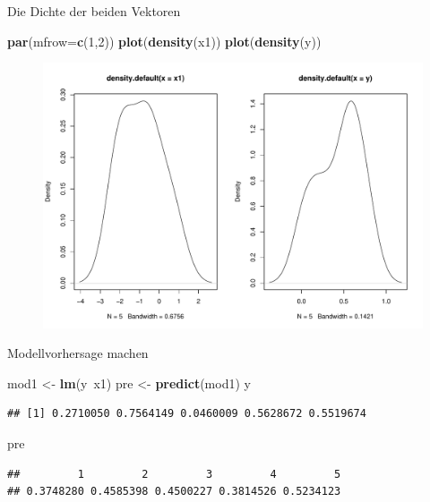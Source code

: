 \documentclass[ignorenonframetext,]{beamer}
\newenvironment{Shaded}{}{}
\newcommand{\KeywordTok}[1]{\textcolor[rgb]{0.00,0.44,0.13}{\textbf{{#1}}}}
\newcommand{\DataTypeTok}[1]{\textcolor[rgb]{0.56,0.13,0.00}{{#1}}}
\newcommand{\DecValTok}[1]{\textcolor[rgb]{0.25,0.63,0.44}{{#1}}}
\newcommand{\StringTok}[1]{\textcolor[rgb]{0.25,0.44,0.63}{{#1}}}
\newcommand{\NormalTok}[1]{{#1}}
\begin{document}
\begin{frame}[fragile]{Die Dichte der beiden Vektoren}

\begin{Shaded}
\begin{Highlighting}[]
\KeywordTok{par}\NormalTok{(}\DataTypeTok{mfrow=}\KeywordTok{c}\NormalTok{(}\DecValTok{1}\NormalTok{,}\DecValTok{2}\NormalTok{))}
\KeywordTok{plot}\NormalTok{(}\KeywordTok{density}\NormalTok{(x1))}
\KeywordTok{plot}\NormalTok{(}\KeywordTok{density}\NormalTok{(y))}
\end{Highlighting}
\end{Shaded}

\begin{figure}[htbp]
\centering
\includegraphics{RSocialScience2_files/figure-beamer/unnamed-chunk-73-1.pdf}
\caption{}
\end{figure}

\end{frame}

\begin{frame}[fragile]{Modellvorhersage machen}

\begin{Shaded}
\begin{Highlighting}[]
\NormalTok{mod1 <-}\StringTok{ }\KeywordTok{lm}\NormalTok{(y~x1)}
\NormalTok{pre <-}\StringTok{ }\KeywordTok{predict}\NormalTok{(mod1)}
\NormalTok{y}
\end{Highlighting}
\end{Shaded}

\begin{verbatim}
## [1] 0.2710050 0.7564149 0.0460009 0.5628672 0.5519674
\end{verbatim}

\begin{Shaded}
\begin{Highlighting}[]
\NormalTok{pre}
\end{Highlighting}
\end{Shaded}

\begin{verbatim}
##         1         2         3         4         5 
## 0.3748280 0.4585398 0.4500227 0.3814526 0.5234123
\end{verbatim}

\end{frame}
\end{document}
